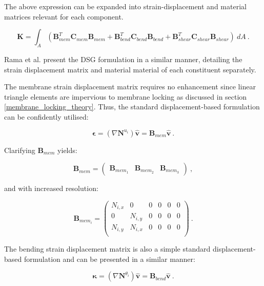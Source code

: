 The above expression can be expanded into strain-displacement and material matrices relevant for each component.

\begin{equation} 
\mathbf{K} = \int_A  (\mathbf{B}_{mem}^T \mathbf{C}_{mem} \mathbf{B}_{mem} + \mathbf{B}_{bend}^T \mathbf{C}_{bend} \mathbf{B}_{bend} + \mathbf{B}_{shear}^T \mathbf{C}_{shear} \mathbf{B}_{shear})\ dA
\label{eqt5}\ .
\end{equation}

Rama et al. \cite{Ram16} present the DSG formulation in a similar manner, detailing the strain displacement matrix and material material of each constituent separately.

The membrane strain displacement matrix requires no enhancement since linear triangle elements are impervious to membrane locking as discussed in section \ref{membrane_locking_theory}. Thus, the standard displacement-based formulation can be confidently utilised:

\begin{equation}
\boldsymbol{\epsilon} =(\nabla \mathbf{N}^{u_{i}}) \hat{\mathbf{v}} 
= \mathbf{B}_{mem} \hat{\mathbf{v}}  
\label{eqt5_1}\ .
\end{equation}

Clarifying $\mathbf{B}_{mem}$ yields:

\begin{equation} 
\mathbf{B}_{mem} =  \begin{pmatrix}
\mathbf{B}_{mem_1} & \mathbf{B}_{mem_2} & \mathbf{B}_{mem_3}
\end{pmatrix} 
\label{eqt6}\ ,
\end{equation}

and with increased resolution:

\begin{equation} 
\mathbf{B}_{mem_i} =  \begin{pmatrix}
N_{i,x} & 0 & 0 & 0 & 0 & 0 \\
0 & N_{i,y} & 0 & 0 & 0 & 0 \\
N_{i,y} & N_{i,x} & 0 & 0 & 0 & 0 \\
\end{pmatrix} 
\label{eqt7}\ .
\end{equation}

The bending strain displacement matrix is also a simple standard displacement-based formulation and can be presented in a similar manner:

\begin{equation}
\boldsymbol{\kappa} =(\nabla \mathbf{N}^{\theta_{i}}) \hat{\mathbf{v}} 
= \mathbf{B}_{bend} \hat{\mathbf{v}}  
\label{eqt7_1}\ .
\end{equation}

